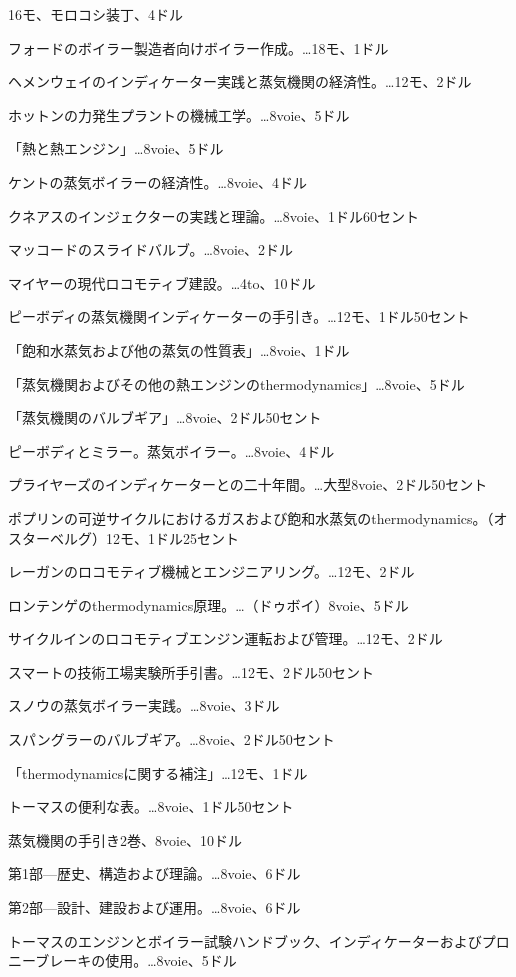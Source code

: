 \documentclass[a4paper,11pt,openany]{ltjsbook}
\begin{document}
16モ、モロコシ装丁、4ドル

フォードのボイラー製造者向けボイラー作成。…18モ、1ドル

ヘメンウェイのインディケーター実践と蒸気機関の経済性。…12モ、2ドル

ホットンの力発生プラントの機械工学。…8voie、5ドル

「熱と熱エンジン」…8voie、5ドル

ケントの蒸気ボイラーの経済性。…8voie、4ドル

クネアスのインジェクターの実践と理論。…8voie、1ドル60セント

マッコードのスライドバルブ。…8voie、2ドル

マイヤーの現代ロコモティブ建設。…4to、10ドル

ピーボディの蒸気機関インディケーターの手引き。…12モ、1ドル50セント

「飽和水蒸気および他の蒸気の性質表」…8voie、1ドル

「蒸気機関およびその他の熱エンジンのthermodynamics」…8voie、5ドル

「蒸気機関のバルブギア」…8voie、2ドル50セント

ピーボディとミラー。蒸気ボイラー。…8voie、4ドル

プライヤーズのインディケーターとの二十年間。…大型8voie、2ドル50セント

ポプリンの可逆サイクルにおけるガスおよび飽和水蒸気のthermodynamics。（オスターベルグ）12モ、1ドル25セント

レーガンのロコモティブ機械とエンジニアリング。…12モ、2ドル

ロンテンゲのthermodynamics原理。…（ドゥボイ）8voie、5ドル

サイクルインのロコモティブエンジン運転および管理。…12モ、2ドル

スマートの技術工場実験所手引書。…12モ、2ドル50セント

スノウの蒸気ボイラー実践。…8voie、3ドル

スパングラーのバルブギア。…8voie、2ドル50セント

「thermodynamicsに関する補注」…12モ、1ドル

トーマスの便利な表。…8voie、1ドル50セント

蒸気機関の手引き2巻、8voie、10ドル

第1部—歴史、構造および理論。…8voie、6ドル

第2部—設計、建設および運用。…8voie、6ドル

トーマスのエンジンとボイラー試験ハンドブック、インディケーターおよびプロニーブレーキの使用。…8voie、5ドル
\end{document}
